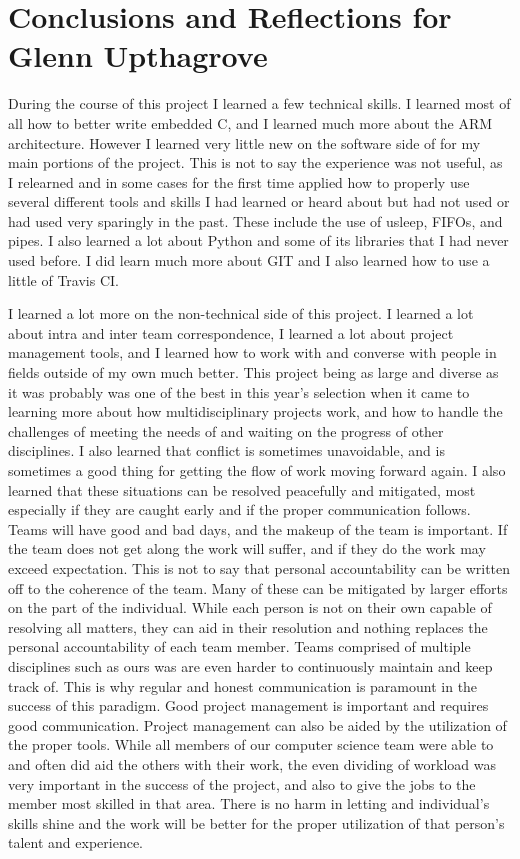 \documentclass[onecolumn, draftclsnofoot,10pt, compsoc]{IEEEtran}
\begin{document}
\section{Conclusions and Reflections for Glenn Upthagrove}
During the course of this project I learned a few technical skills. I learned most of all how to better write embedded C, and I learned much more about the ARM architecture. However I learned very little new on the software side of for my main portions of the project. This is not to say the experience was not useful, as I relearned and in some cases for the first time applied how to properly use several different tools and skills I had learned or heard about but had not used or had used very sparingly in the past. These include the use of usleep, FIFOs, and pipes. I also learned a lot about Python and some of its libraries that I had never used before. I did learn much more about GIT and I also learned how to use a little of Travis CI. \par
I learned a lot more on the non-technical side of this project. I learned a lot about intra and inter team correspondence, I learned a lot about project management tools, and I learned how to work with and converse with people in fields outside of my own much better. This project being as large and diverse as it was probably was one of the best in this year’s selection when it came to learning more about how multidisciplinary projects work, and how to handle the challenges of meeting the needs of and waiting on the progress of other disciplines. I also learned that conflict is sometimes unavoidable, and is sometimes a good thing for getting the flow of work moving forward again. I also learned that these situations can be resolved peacefully and mitigated, most especially if they are caught early and if the proper communication follows. Teams will have good and bad days, and the makeup of the team is important. If the team does not get along the work will suffer, and if they do the work may exceed expectation. This is not to say that personal accountability can be written off to the coherence of the team. Many of these can be mitigated by larger efforts on the part of the individual. While each person is not on their own capable of resolving all matters, they can aid in their resolution and nothing replaces the personal accountability of each team member. Teams comprised of multiple disciplines such as ours was are even harder to continuously maintain and keep track of. This is why regular and honest communication is paramount in the success of this paradigm. Good project management is important and requires good communication. Project management can also be aided by the utilization of the proper tools. While all members of our computer science team were able to and often did aid the others with their work, the even dividing of workload was very important in the success of the project, and also to give the jobs to the member most skilled in that area. There is no harm in letting and individual’s skills shine and the work will be better for the proper utilization of that person’s talent and experience.\par
\end{document}
